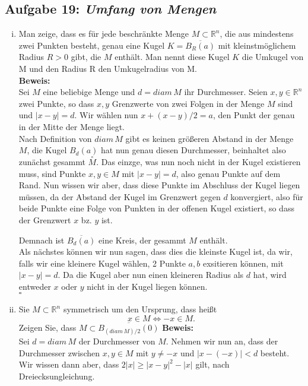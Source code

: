 \documentclass[11pt,a4paper,ngerman]{article}
\begin{document}
\subsection*{Aufgabe 19: \mdseries\itshape Umfang von Mengen}
	\begin{enumerate}[(i)]
		\item Man zeige, dass es für jede beschränkte Menge $M \subset \mathbb{R}^n$, die aus mindestens zwei Punkten besteht,
		genau eine Kugel $K = \overline{B_R(a)}$ mit kleinstmöglichem Radius $R > 0$ gibt, die $M$ enthält. Man nennt diese Kugel 
		$K$ die Umkugel von M und den Radius R den Umkugelradius von M.\\
		\textbf{Beweis:}\\
			Sei $M$ eine beliebige Menge und $d = diam \, M$ ihr Durchmesser. Seien
            $x, y \in \mathbb{R}^n$ zwei Punkte, so dass $x,y$ Grenzwerte von zwei Folgen
            in der Menge $M$ sind und $|x - y| = d$. Wir wählen nun $x + (x-y)/2 = a$, den
            Punkt der genau in der Mitte der Menge liegt.\\

            Nach Definition von $diam \, M$ gibt es keinen größeren Abstand in der Menge
            $M$, die Kugel $B_d(a)$ hat nun genau diesen Durchmesser, beinhaltet also
            zunächst gesammt $\overset{\circ}{M}$. Das einzge, was nun noch nicht in
            der Kugel existieren muss, sind Punkte $x,y\in M$ mit $|x -y | = d$,
            also genau Punkte auf dem Rand. Nun wissen wir aber, dass diese
            Punkte im Abschluss der Kugel liegen müssen, da der Abstand der Kugel
            im Grenzwert gegen $d$ konvergiert, also für beide Punkte eine
            Folge von Punkten in der offenen Kugel existiert, so dass der Grenzwert
            $x$ bz. $y$ ist.

            Demnach ist $\overline{B_d(a)}$ eine Kreis, der gesammt $M$ enthält.\\

            Als nächstes können wir nun sagen, dass dies die kleinste Kugel ist,
            da wir, falls wir eine kleinere Kugel wählen, 2 Punkte $a,b$ exsitieren
            können, mit $|x - y| = d$. Da die Kugel aber nun einen kleineren Radius als
            $d$ hat, wird entweder $x$ oder $y$ nicht in der Kugel liegen können.\\

            \mbox{} \hfill $\square$

		\item Sie $M \subset \mathbb{R}^n$ symmetrisch um den Ursprung, dass heißt
			$$
				x \in M \Longleftrightarrow -x \in M.
			$$
			Zeigen Sie, dass $M \subset \overline{B_{(diam \, M )/ 2}(0)}$
		\textbf{Beweis:}\\
			Sei $d = diam \, M$ der Durchmesser von $M$. Nehmen wir nun an, dass
            der Durchmesser zwischen $x,y \in M$ mit $y \not= -x$ und $|x - (-x)| < d$
            besteht. Wir wissen
            dann aber, dass $2 |x| \geq |x - y|^2 - |x|$ gilt, nach Dreiecksungleichung.\\
        

\end{enumerate}
\end{document}
